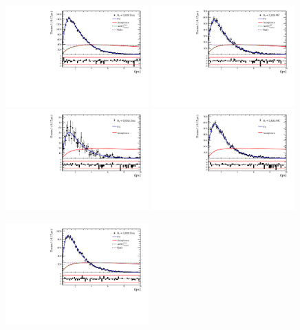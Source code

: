 \begin{figure}[h]
\includegraphics[height=!,width=0.49\textwidth]{figs/Acceptance/adaptive_N4/timeAccRatioFit_norm_Run2_t0.pdf}
\includegraphics[height=!,width=0.49\textwidth]{figs/Acceptance/adaptive_N4/timeAccRatioFit_norm_MC_Run2_t0.pdf}
\includegraphics[height=!,width=0.49\textwidth]{figs/Acceptance/adaptive_N4/timeAccRatioFit_signal_B0_Run2_t0.pdf}
\includegraphics[height=!,width=0.49\textwidth]{figs/Acceptance/adaptive_N4/timeAccRatioFit_signal_MC_Run2_t0.pdf}
\caption{}
\label{fig:}
\includegraphics[height=!,width=0.49\textwidth]{figs/Acceptance/adaptive_N4/timeAccRatioFit_norm_Run2_t1.pdf}

\end{figure}
